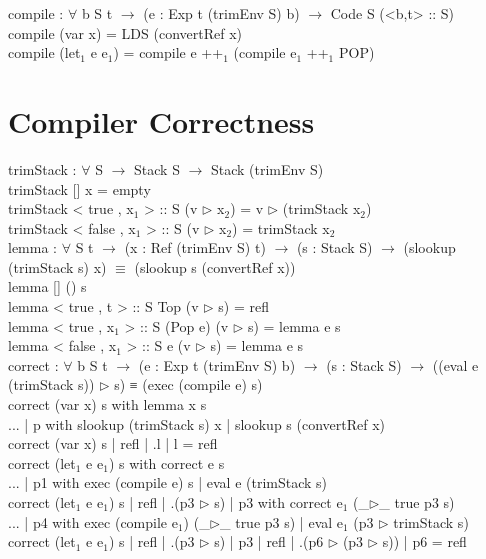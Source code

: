 \documentclass[paper=a4, fontsize=11pt]{scrartcl} %
\numberwithin{equation}{section} %
\numberwithin{figure}{section} %
\numberwithin{table}{section} %
\begin{document}
compile : $\forall$ {b S t} $\rightarrow$ (e : Exp t (trimEnv S) b) $\rightarrow$ Code S (<b,t> :: S)\\
compile (var x) = LDS (convertRef x)\\
compile (let$_1$ e e$_1$) = compile e ++$_1$ (compile e$_1$ ++$_1$ POP)\\
\normalfont

\section{Compiler Correctness}
\ttfamily
trimStack : $\forall$ {S} $\rightarrow$ Stack S $\rightarrow$ Stack (trimEnv S)\\
trimStack {[]} x = empty\\
trimStack {< true , x$_1$ > :: S} (v $\rhd$ x$_2$) = v $\rhd$ (trimStack x$_2$)\\
trimStack {< false , x$_1$ > :: S} (v $\rhd$ x$_2$) = trimStack x$_2$\\


lemma : $\forall$ {S t} $\rightarrow$ (x : Ref (trimEnv S) t) $\rightarrow$ (s : Stack S) $\rightarrow$ (slookup (trimStack s) x) $\equiv$ (slookup s (convertRef x))\\
lemma {[]} () s\\
lemma {< true , t > :: S} Top (v $\rhd$ s) = refl\\
lemma {< true , x$_1$ > :: S} (Pop e) (v $\rhd$ s) = lemma e s\\
lemma {< false , x$_1$ > :: S} e (v $\rhd$ s) = lemma e s\\

correct : $\forall$ {b S t} $\rightarrow$ (e : Exp t (trimEnv S) b) $\rightarrow$ (s : Stack S) $\rightarrow$ ((eval e (trimStack s)) $\rhd$ s) ≡ (exec (compile e) s)\\
correct (var x) s with lemma x s\\
... | p with slookup (trimStack s) x | slookup s (convertRef x) \\
correct (var x) s | refl | .l | l = refl\\
correct (let$_1$ e e$_1$) s with correct e s\\
... | p1 with exec (compile e) s | eval e (trimStack s)\\
correct (let$_1$ e e$_1$) s | refl | .(p3 $\rhd$ s) | p3 with correct e$_1$ (\_$\rhd$\_ {true} p3 s)\\
... | p4 with exec (compile e$_1$) (\_$\rhd$\_ {true} p3 s) | eval e$_1$ (p3 $\rhd$ trimStack s)\\
correct (let$_1$ e e$_1$) s | refl | .(p3 $\rhd$ s) | p3 | refl | .(p6 $\rhd$ (p3 $\rhd$ s)) | p6 = refl\\
\normalfont
\end{document}
